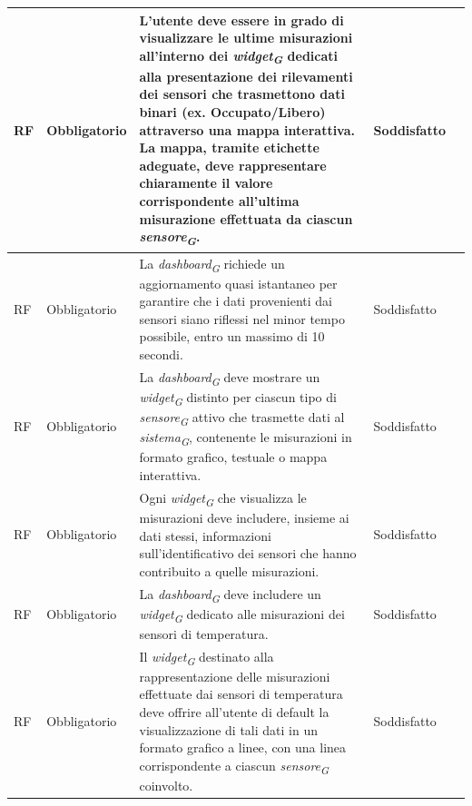 \begin{longtable}{|C{1.5cm}|C{2cm}|L{5cm}|C{2cm}|C{1.5cm}|}
    \hline
     RF & Obbligatorio &  L'utente deve essere in grado di visualizzare le ultime misurazioni all'interno dei \textit{widget}\textsubscript{\textit{G}} dedicati alla presentazione dei rilevamenti dei sensori che trasmettono dati binari (ex. Occupato/Libero) attraverso una mappa interattiva. La mappa, tramite etichette adeguate, deve rappresentare chiaramente il valore corrispondente all'ultima misurazione effettuata da ciascun \textit{sensore}\textsubscript{\textit{G}}.& Soddisfatto \\
    
    \hline
     RF & Obbligatorio & La \textit{dashboard}\textsubscript{\textit{G}} richiede un aggiornamento quasi istantaneo per garantire che i dati provenienti dai sensori siano riflessi nel minor tempo possibile, entro un massimo di 10 secondi.& Soddisfatto \\
    
    \hline
     RF & Obbligatorio & La \textit{dashboard}\textsubscript{\textit{G}} deve mostrare un \textit{widget}\textsubscript{\textit{G}} distinto per ciascun tipo di \textit{sensore}\textsubscript{\textit{G}} attivo che trasmette dati al \textit{sistema}\textsubscript{\textit{G}}, contenente le misurazioni in formato grafico, testuale o mappa interattiva.& Soddisfatto \\
    
    \hline
     RF & Obbligatorio & Ogni \textit{widget}\textsubscript{\textit{G}} che visualizza le misurazioni deve includere, insieme ai dati stessi, informazioni sull'identificativo dei sensori che hanno contribuito a quelle misurazioni.& Soddisfatto \\
    
    \hline
     RF & Obbligatorio & La \textit{dashboard}\textsubscript{\textit{G}} deve includere un \textit{widget}\textsubscript{\textit{G}} dedicato alle misurazioni dei sensori di temperatura.& Soddisfatto \\
    
    \hline
     RF & Obbligatorio &Il \textit{widget}\textsubscript{\textit{G}} destinato alla rappresentazione delle misurazioni effettuate dai sensori di temperatura deve offrire all'utente di default la visualizzazione di tali dati in un formato grafico a linee, con una linea corrispondente a ciascun \textit{sensore}\textsubscript{\textit{G}} coinvolto.& Soddisfatto \\
    

\end{longtable}
